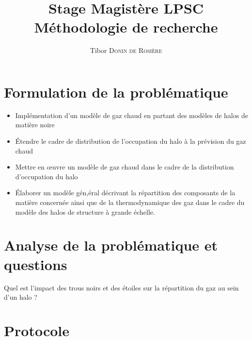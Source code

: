 \documentclass[a4paper, french, 11 pt]{article}
\title{\textbf{Stage Magistère LPSC}\\ Méthodologie de recherche}
\author{Tibor \textsc{Donin de Rosière}}
\begin{document}
\maketitle
\section{Formulation de la problématique}
\begin{itemize}[label=\textbullet]
\item Implémentation d'un modèle de gaz chaud en partant des modèles de halos de matière noire
\item Étendre le cadre de distribution de l'occupation du halo à la prévision du gaz chaud
\item Mettre en œuvre un modèle de gaz chaud dans le cadre de la distribution d'occupation du halo
\item Élaborer un modèle gén,éral décrivant la répartition des composants de la matière concernée ainsi que de la thermodynamique des gaz dans le cadre du modèle des halos de structure à grande échelle.
\end{itemize}

\section{Analyse de la problématique et questions}
Quel est l'impact des trous noirs et des étoiles sur la répartition du gaz au sein d'un halo ?\\

\section{Protocole}
\end{document}
